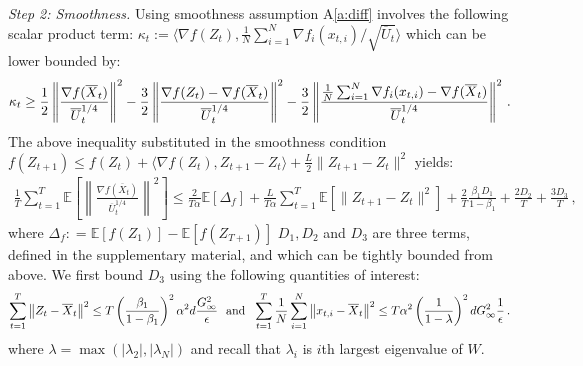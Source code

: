 \documentclass{article} %
\begin{document}
 \textsl{Step 2: Smoothness.} \hspace{0.01in} Using smoothness assumption A\ref{a:diff} involves the following scalar product term: $\kappa_t := \langle \nabla f( Z_{t}), \frac{1}{N} \sum_{i=1}^N \nabla f_i( x_{t,i})/\sqrt{\overline U_{t}} \rangle$ which can be lower bounded by:
 \begin{align} \notag
  \kappa_t \geq  \frac{1}{2} \left\|\frac{\nabla f( \overline X_{t})}{\overline U_{t}^{1/4}}\right\|^2   - \frac{3}{2} \left\|\frac{\nabla f( Z_{t}) -\nabla f( \overline X_{t})}{\overline U_{t}^{1/4}}\right\|^2- \frac{3}{2} \left\|  \frac{ \frac{1}{N}\sum_{i=1}^N \nabla f_i( x_{t,i}) -  \nabla f( \overline X_{t})}{\overline U_{t}^{1/4}}  \right\|^2 \, .
 \end{align}
 The above inequality substituted in the smoothness condition $ f( Z_{t+1}) \leq f( Z_{t}) + \langle \nabla f( Z_{t}),  Z_{t+1}-  Z_{t} \rangle + \frac{L}{2}\| Z_{t+1}-  Z_{t}\|^2 $ yields:
 \begin{align} \label{eq: exp_telescope_sketch}
 \frac{1}{T}\sum_{t=1}^T  \mathbb E \left [\left\|\frac{\nabla f( \overline X_{t})}{\overline U_{t}^{1/4}}\right\|^2  \right] \leq \frac{2}{T\alpha}  \mathbb E  [\Delta_f] + \frac{L}{T\alpha} \sum_{t=1}^T\mathbb E\left[\| Z_{t+1}-  Z_{t}\|^2 \right]+ \frac{2}{T}\frac{\beta_1 D_1}{1-\beta_1}  + \frac{2 D_2}{T}  + \frac{3 D_3}{T} \, ,
 \end{align}
where $\Delta_f : = \mathbb E [f( Z_{1})] - \mathbb E [f( Z_{T+1})]$ $D_1, D_2$ and $D_3$ are three terms, defined in the supplementary material, and which can be tightly bounded from above. 
We first bound $D_3$ using the following quantities of interest:
 \begin{align}\notag
 \sum_{t=1}^T\left\|  Z_{t} -  \overline X_{t}\right\|^2 \leq T \left( \frac{\beta_1}{1-\beta_1}\right)^2 \alpha^2 d \frac{G_{\infty}^2}{\epsilon} \text{\ \ and\ \ }
 \sum_{t=1}^T\frac{1}{N}\sum_{i=1}^N\left\| {  x_{t,i} -   \overline X_{t}}  \right\|^2 \leq T \alpha^2 \left (\frac{1}{1-\lambda} \right)^2 d G_{\infty}^2 \frac{1}{\epsilon} \,.
 \end{align}
 where $\lambda = \max (|\lambda_2|,|\lambda_N|)$ and recall that $\lambda_i$ is $i$th largest eigenvalue of $W$.
 
\end{document}
